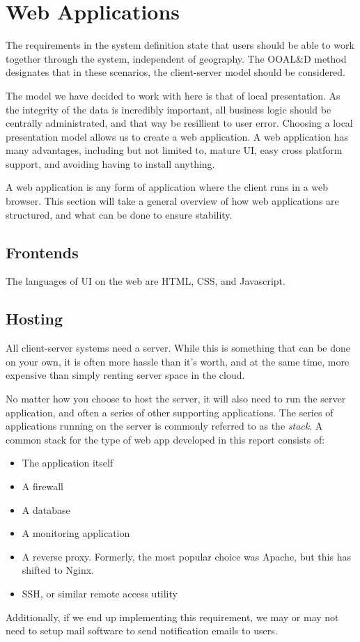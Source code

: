 \section{Web Applications}
The requirements in the system definition state that users should be able to work together through the system, independent of geography.
The OOAL\&D method designates that in these scenarios, the client-server model should be considered.

The model we have decided to work with here is that of local presentation.
As the integrity of the data is incredibly important, all business logic should be centrally administrated, and that way be resillient to user error.
Choosing a local presentation model allows us to create a web application.
A web application has many advantages, including but not limited to, mature UI, easy cross platform support, and avoiding having to install anything.

A web application is any form of application where the client runs in a web browser.
This section will take a general overview of how web applications are structured, and what can be done to ensure stability.

\subsection{Frontends}
The languages of UI on the web are HTML, CSS, and Javascript.
\subsection{Hosting}
All client-server systems need a server.
While this is something that can be done on your own, it is often more hassle than it's worth, and at the same time, more expensive than simply renting server space in the cloud.

No matter how you choose to host the server, it will also need to run the server application, and often a series of other supporting applications.
The series of applications running on the server is commonly referred to as the \textit{stack}.
A common stack for the type of web app developed in this report consists of:
\begin{itemize}
\item The application itself
\item A firewall
\item A database
\item A monitoring application
\item A reverse proxy.
Formerly, the most popular choice was Apache, but this has shifted to Nginx.
\item SSH, or similar remote access utility
\end{itemize}
Additionally, if we end up implementing this requirement, we may or may not need to setup mail software to send notification emails to users.
